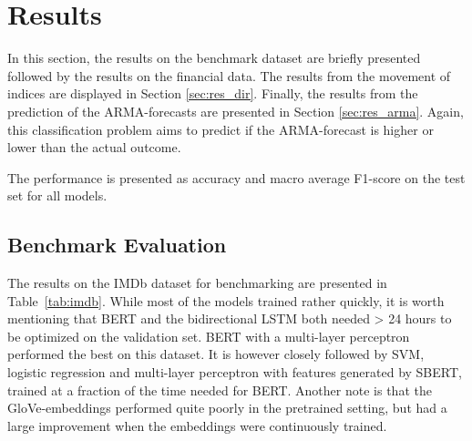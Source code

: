 \chapter{Results}\label{chap:results}

In this section, the results on the benchmark dataset are briefly presented followed by the results on the financial data.
The results from the movement of indices are displayed in Section \ref{sec:res_dir}. Finally, the results from the prediction of the ARMA-forecasts are presented in Section \ref{sec:res_arma}. Again, this classification problem aims to predict if the ARMA-forecast is higher or lower than the actual outcome. 

The performance is presented as accuracy and macro average F1-score on the test set for all models. 

\newpage
\section{Benchmark Evaluation}

The results on the IMDb dataset for benchmarking are presented in Table~\ref{tab:imdb}. While most of the models trained rather quickly, it is worth mentioning that BERT and the bidirectional LSTM both needed > 24 hours to be optimized on the validation set.
BERT with a multi-layer perceptron performed the best on this dataset. It is however closely followed by SVM, logistic regression and multi-layer perceptron with features generated by SBERT, trained at a fraction of the time needed for BERT.
Another note is that the GloVe-embeddings performed quite poorly in the pretrained setting, but had a large improvement when the embeddings were continuously trained. 

